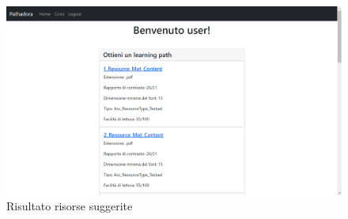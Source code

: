 \begin{figure}[H]
\centering
\includegraphics[scale=0.4]{res/path-result.png}
\caption{Risultato risorse suggerite}
\label{fig:resources-generation}
\end{figure}